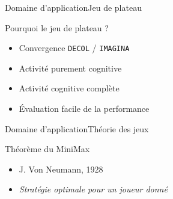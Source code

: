 \begin{frame}{Domaine d'application}{Jeu de plateau}

\begin{block}{Pourquoi le jeu de plateau ?}
\begin{itemize}
\item Convergence \texttt{DECOL} / \texttt{IMAGINA}
\pause
\item Activité purement cognitive
\pause
\item Activité cognitive complète
\pause
\item Évaluation facile de la performance
\end{itemize}
\end{block}

\end{frame}


\begin{frame}{Domaine d'application}{Théorie des jeux}

\begin{block}{Théorème du MiniMax}
\begin{itemize}
\item J. Von Neumann, 1928
\item \textit{Stratégie optimale pour un joueur donné}
\end{itemize}
\end{block}
\end{frame}



